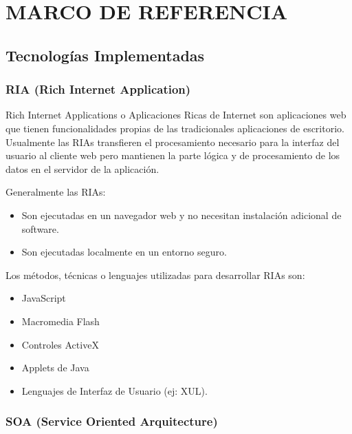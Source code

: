 \section{MARCO DE REFERENCIA}

\subsection{Tecnologías Implementadas}

\label{tec:all}

\subsubsection*{RIA (Rich Internet Application)}
\label{tec:ria}

Rich Internet Applications o Aplicaciones Ricas de Internet son aplicaciones web que tienen funcionalidades propias de las tradicionales aplicaciones de escritorio. Usualmente las RIAs transfieren el procesamiento necesario para la interfaz del usuario al cliente web pero mantienen la parte lógica y de procesamiento de los datos en el servidor de la aplicación.

Generalmente las RIAs:

\begin{itemize}
	
	\item Son ejecutadas en un navegador web y no necesitan instalación adicional de software.
	
	\item Son ejecutadas localmente en un entorno seguro.
	
\end{itemize}

Los métodos, técnicas o lenguajes utilizadas para desarrollar RIAs son:

\begin{itemize}
	\item JavaScript
	\item Macromedia Flash
	\item Controles ActiveX
	\item Applets de Java
	\item Lenguajes de Interfaz de Usuario (ej: XUL).
\end{itemize}

\subsubsection*{SOA (Service Oriented Arquitecture) \cite{soa} }
\label{tec:soa}

